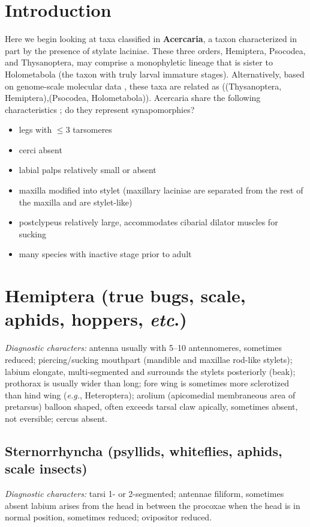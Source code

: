 \section*{Introduction}
Here we begin looking at taxa classified in \textbf{Acercaria}, a taxon characterized in part by the presence of stylate laciniae. These three orders, Hemiptera, Psocodea, and Thysanoptera, may comprise a monophyletic lineage that is sister to Holometabola (the taxon with truly larval immature stages). Alternatively, based on genome-scale molecular data \citep{Misof763}, these taxa are related as ((Thysanoptera, Hemiptera),(Psocodea, Holometabola)). Acercaria share the following characteristics \citep{beutel2013insect}; do they represent synapomorphies?

\begin{itemize}
\item legs with $\le$3 tarsomeres
\item cerci absent 
\item labial palps relatively small or absent 
\item maxilla modified into stylet (maxillary laciniae are separated from the rest of the maxilla and are stylet-like)
\item postclypeus relatively large, accommodates cibarial dilator muscles for sucking
\item many species with inactive stage prior to adult
\end{itemize}

\section{Hemiptera (true bugs, scale, aphids, hoppers, \textit{etc}.)}
\noindent{}\textit{Diagnostic characters:} antenna usually with 5--10 antennomeres, sometimes reduced; piercing/sucking mouthpart (mandible and maxillae rod-like stylets); labium elongate, multi-segmented and surrounds the stylets posteriorly (beak); prothorax is usually wider than long; fore wing is sometimes more sclerotized than hind wing (\textit{e.g.}, Heteroptera); arolium (apicomedial membraneous area of pretarsus) balloon shaped, often exceeds tarsal claw apically, sometimes absent, not eversible; cercus absent.\vspace{3mm}

\subsection{Sternorrhyncha (psyllids, whiteflies, aphids, scale insects)}
\noindent{}\textit{Diagnostic characters:} tarsi 1- or 2-segmented; antennae filiform, sometimes absent labium arises from the head in between the procoxae when the head is in normal position, sometimes reduced; ovipositor reduced.\vspace{3mm}

